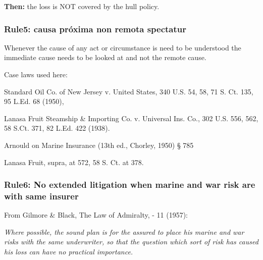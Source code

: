     \textbf{Then:} the loss is NOT covered by the hull policy.


\subsubsection{Rule5: causa próxima non remota spectatur}

Whenever the cause of any act or circumstance is need to be understood the immediate cause needs to be looked at and not the remote cause.

Case laws used here:

Standard Oil Co. of New Jersey v. United States, 340 U.S. 54, 58, 71 S. Ct. 135, 95 L.Ed. 68 (1950),

Lanasa Fruit Steamship \& Importing Co. v. Universal Ins. Co., 302 U.S. 556, 562, 58 S.Ct. 371, 82 L.Ed. 422 (1938).

Arnould on Marine Insurance (13th ed., Chorley, 1950) § 785

Lanasa Fruit, supra, at 572, 58 S. Ct. at 378.




\subsubsection{Rule6: No extended litigation when marine and war risk are with same insurer}

From Gilmore \& Black, The Law of Admiralty, - 11 (1957):

\textit{Where possible, the sound plan is for the assured to place his marine and war risks
with the same underwriter, so that the question which sort of risk has caused his
loss can have no practical importance.}

